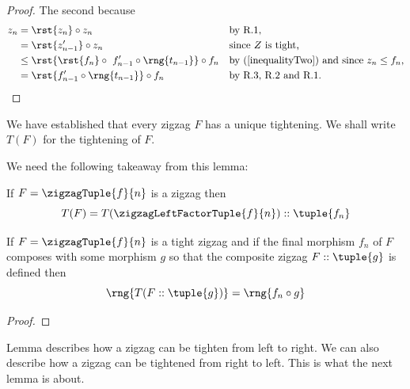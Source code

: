 {\begin{proof}
The second  because
\begin{align*}
 z_n &= \rst{z_n} \circ z_n
         &&\mbox{by R.1,}\\        
     &=  \rst{z'_{n-1}} \circ z_n 
         &&\mbox{since $Z$ is tight,}\\
     &\leq  \rst{\rst{f_n} \circ\ f'_{n-1} \circ \rng{t_{n-1}}} \circ f_n
         &&\mbox{by (\ref{inequalityTwo}) and since $z_n \leq f_n$,} \\
         &= \rst{f'_{n-1} \circ \rng{t_{n-1}}} \circ f_n
         && \mbox{by R.3, R.2 and R.1.}
\end{align*}
\end{proof}
} %
We have established that every zigzag $F$ has a unique tightening. 
We shall write $T(F)$ for the tightening of $F$. 


\begin{worktt}
We  need the following takeaway from this lemma:
\begin{observation}

If $F=\zigzagTuple{f}{n}$ is a zigzag then
\[
T(F) = T(\zigzagLeftFactorTuple{f}{n}) ::\tuple{f_n}
\] 
\end{observation}
\end{worktt}


\begin{worktt}
\begin{lemma}
If  $F=\zigzagTuple{f}{n}$ is a tight zigzag 
and if the final morphism $f_n$ of $F$ composes with some morphism $g$
 so that the composite zigzag $F :: \tuple{g}$ is defined then
\[
\rng{T(F :: \tuple{g})}=\rng{f_n \circ g}
\]
\end{lemma}
\begin{proof}

\end{proof}
\end{worktt}

Lemma  describes how a zigzag can be tighten from left to right. We can also describe how a zigzag can be
tightened from right to left. This is what the next lemma is about.
\iffalse
\newcommand{\tightTail}
  {\rst{f'_1 \circ \rng{f_1}} \circ f_2,\;
  f'_2,...f_{n-2},f'_{n-1}, f_n
  }      

